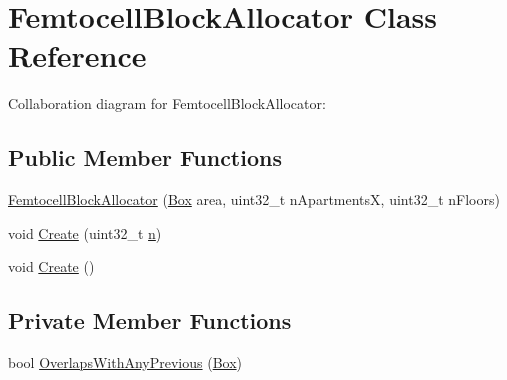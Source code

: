 \hypertarget{classFemtocellBlockAllocator}{}\section{Femtocell\+Block\+Allocator Class Reference}
\label{classFemtocellBlockAllocator}


Collaboration diagram for Femtocell\+Block\+Allocator\+:
\subsection*{Public Member Functions}
\begin{DoxyCompactItemize}
\item 
\hyperlink{classFemtocellBlockAllocator_a6258c3cdb7be54a9500e8f74967ca7b5}{Femtocell\+Block\+Allocator} (\hyperlink{classns3_1_1Box}{Box} area, uint32\+\_\+t n\+ApartmentsX, uint32\+\_\+t n\+Floors)
\item 
void \hyperlink{classFemtocellBlockAllocator_a2171808c3f563b2b18858fa15efc5c5e}{Create} (uint32\+\_\+t \hyperlink{lte__link__budget__x2__handover__measures_8m_abdb05bc5a064cf642a06c83b3392f148}{n})
\item 
void \hyperlink{classFemtocellBlockAllocator_ac3f3dd07dae696b6991e9d483e4fffe5}{Create} ()
\end{DoxyCompactItemize}
\subsection*{Private Member Functions}
\begin{DoxyCompactItemize}
\item 
bool \hyperlink{classFemtocellBlockAllocator_a563ae74d02aff413fff3cbf8ef44f54f}{Overlaps\+With\+Any\+Previous} (\hyperlink{classns3_1_1Box}{Box})
\end{DoxyCompactItemize}
